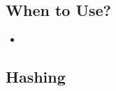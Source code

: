 \subsection{When to Use?}
\begin{summary}
    \begin{itemize}
        \item 
    \end{itemize}
\end{summary}

\subsection{Hashing}
\begin{algo}
    
\end{algo}

